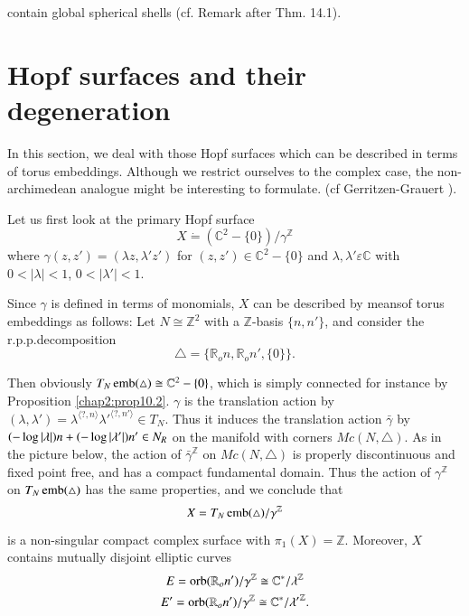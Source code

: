 contain global spherical shells (cf. Remark after Thm. 14.1).  
\

\section{Hopf surfaces and their degeneration}\label{chap2:sec13} 

In this section, we deal with those Hopf surfaces which can be
described in terms of torus embeddings. Although we restrict ourselves
to the complex case, the non-archimedean analogue might be interesting
to formulate. (cf Gerritzen-Grauert \cite{keyGG}). 

Let us first look at the primary Hopf surface
$$
X \dot{=} (\mathbb{C}^2 - \{0\}) / \gamma^{\mathbb{Z}}
$$
where $\gamma (z, z') = (\lambda z, \lambda'z')$ for $(z, z') \in
\mathbb{C}^2 - \{ 0 \}$ and $\lambda, \lambda' \varepsilon \mathbb{C}$  with
$0 < | \lambda | < 1$, $0 < | \lambda' | < 1$. 

Since $\gamma$ is defined in terms of monomials, $X$ can be described
by means\pageoriginale of torus embeddings as follows: Let $N \cong
\mathbb{Z}^2$ with a $\mathbb{Z}$-basis $\{n, n'\}$, and consider the 
r.p.p.decomposition  
$$
\triangle = \{ \mathbb{R}_o n, \mathbb{R}_o n', \{0\} \}. 
$$

Then obviously $T_N \operatorname{emb} (\triangle) \cong \mathbb{C}^2 - \{0 \}$,
which is simply connected for instance by Proposition
\ref{chap2:prop10.2}. $\gamma$ 
is the translation action  by $(\lambda, \lambda') = \lambda^{\langle ?, n \rangle
} {\lambda'}^{\langle ?,n' \rangle} \in T_N$. Thus it induces the
translation action 
$\bar{\gamma}$ by $ (-\log | \lambda |)\break n + (-\log | \lambda' | )n'
\in N_R $ on the manifold with corners $Mc (N, \triangle)$. As in the
picture below, the action of $\bar{\gamma}^{\mathbb{Z}}$ on $Mc (N,
\triangle)$ is properly discontinuous and fixed point free, and has a
compact fundamental domain. Thus  the action of $\gamma^{\mathbb{Z}}$
on $T_N \operatorname{emb} (\triangle)$ has the same properties, and we conclude
that 
$$
X = T_N \operatorname{emb} (\triangle) / \gamma^{\mathbb{Z}}
$$
is a non-singular compact complex surface with $\pi_1 (X) =
\mathbb{Z}$. Moreover, $X$ contains mutually disjoint elliptic curves 
\begin{gather*}
E = \operatorname{orb} (\mathbb{R}_o n') / \gamma^{\mathbb{Z}} \cong \mathbb{C}^* /
\lambda^{\mathbb{Z}}\\ 
E' = \operatorname{orb} (\mathbb{R}_o n') / \gamma^{\mathbb{Z}} \cong \mathbb{C}^* /
{\lambda'}^{\mathbb{Z}}. 
 \end{gather*} 
 
